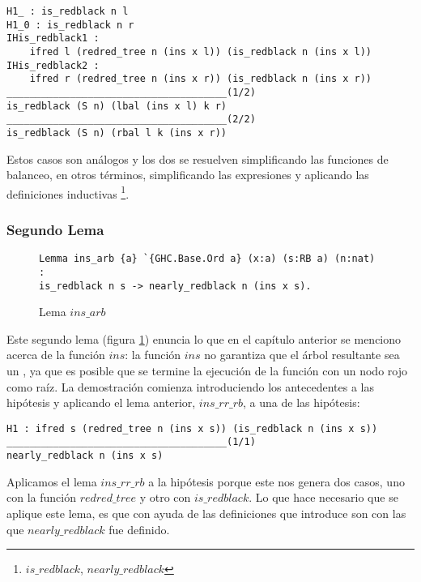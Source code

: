 \begin{verbatim}
H1_ : is_redblack n l
H1_0 : is_redblack n r
IHis_redblack1 :
    ifred l (redred_tree n (ins x l)) (is_redblack n (ins x l))
IHis_redblack2 :
    ifred r (redred_tree n (ins x r)) (is_redblack n (ins x r))
______________________________________(1/2)
is_redblack (S n) (lbal (ins x l) k r)
______________________________________(2/2)
is_redblack (S n) (rbal l k (ins x r))
\end{verbatim}

Estos casos son análogos y los dos se resuelven simplificando las funciones de balanceo, en otros 
términos, simplificando las expresiones y aplicando las definiciones inductivas 
\footnote{\hyperref[inductive_isRedB]{$is\_redblack$}, 
\hyperref[inductive_isRedB]{$nearly\_redblack$}}.

\subsubsection{Segundo Lema}

\begin{figure}[!ht]
\centering
\captionsetup{justification=centering}
\begin{verbatim}
Lemma ins_arb {a} `{GHC.Base.Ord a} (x:a) (s:RB a) (n:nat) :
is_redblack n s -> nearly_redblack n (ins x s).
\end{verbatim}
\caption{Lema $ins\_arb$}
\label{lema_2}
\end{figure}

Este segundo lema (figura \ref{lema_2}) enuncia lo que en el cap\'itulo anterior se menciono acerca
de la funci\'on \hyperref[func_ins]{$ins$}: la funci\'on \hyperref[func_ins]{$ins$} no garantiza que 
el \'arbol resultante sea un {\arn}, ya que es posible que se termine la ejecuci\'on de la funci\'on 
con un nodo rojo como raíz. La demostraci\'on comienza introduciendo los antecedentes a las 
hipótesis y aplicando el lema anterior, \hyperref[lema_1]{$ins\_rr\_rb$}, a una de las hip\'otesis:

\begin{verbatim}
H1 : ifred s (redred_tree n (ins x s)) (is_redblack n (ins x s))
______________________________________(1/1)
nearly_redblack n (ins x s)

\end{verbatim}

Aplicamos el lema \hyperref[lema_1]{$ins\_rr\_rb$} a la hip\'otesis porque este nos genera dos 
casos, uno con la funci\'on \hyperref[inductive_isRedB]{$redred\_tree$} y otro con 
\hyperref[inductive_isRedB]{$is\_redblack$}. Lo que hace necesario que se aplique este lema, es que 
con ayuda de las definiciones que introduce son con las que 
\hyperref[inductive_isRedB]{$nearly\_redblack$} fue definido.


